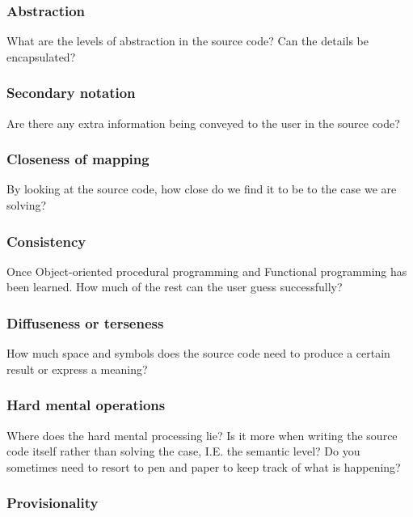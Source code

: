 \documentclass[12pt]{report}
\theoremstyle{definition}
\theoremstyle{theorem}
\begin{document}
\subsubsection*{Abstraction}

What are the levels of abstraction in the source code? Can the details be
encapsulated?

\subsubsection*{Secondary notation}

Are there any extra information being conveyed to the user in the source code?

\subsubsection*{Closeness of mapping}

By looking at the source code, how close do we find it to be to the case
we are solving?

\subsubsection*{Consistency}

Once Object-oriented procedural programming and Functional programming has been
learned. How much of the rest can the user guess successfully? 

\subsubsection*{Diffuseness or terseness}

How much space and symbols does the source code need to produce a certain result
or express a meaning?

\subsubsection*{Hard mental operations}

Where does the hard mental processing lie? Is it more when writing the source
code itself rather than solving the case, I.E. the semantic level? Do you
sometimes need to resort to pen and paper to keep track of what is happening?

\subsubsection*{Provisionality}
\end{document}
